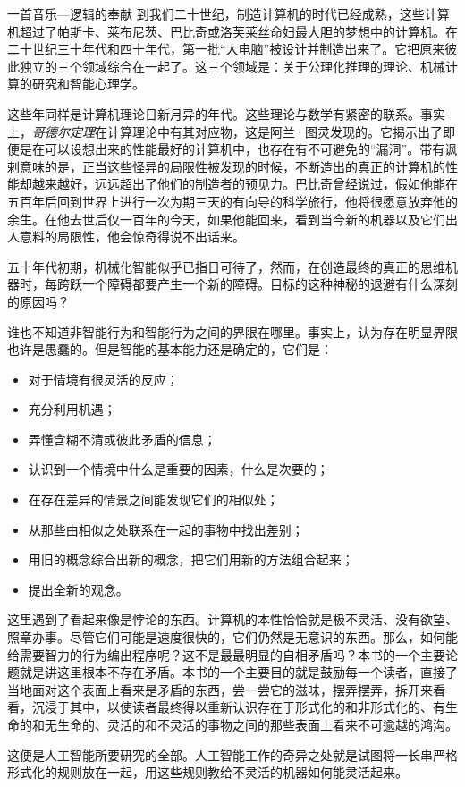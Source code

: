 \begin{intro}{一首音乐—逻辑的奉献}
到我们二十世纪，制造计算机的时代已经成熟，这些计算机超过了帕斯卡、莱布尼茨、巴比奇或洛芙莱丝命妇最大胆的梦想中的计算机。在二十世纪三十年代和四十年代，第一批“大电脑”被设计并制造出来了。它把原来彼此独立的三个领域综合在一起了。这三个领域是：关于公理化推理的理论、机械计算的研究和智能心理学。

这些年同样是计算机理论日新月异的年代。这些理论与数学有紧密的联系。事实上，\emph{哥德尔定理}在计算理论中有其对应物，这是阿兰·图灵发现的。它揭示出了即便是在可以设想出来的性能最好的计算机中，也存在有不可避免的“漏洞”。带有讽剌意味的是，正当这些怪异的局限性被发现的时候，不断造出的真正的计算机的性能却越来越好，远远超出了他们的制造者的预见力。巴比奇曾经说过，假如他能在五百年后回到世界上进行一次为期三天的有向导的科学旅行，他将很愿意放弃他的余生。在他去世后仅一百年的今天，如果他能回来，看到当今新的机器以及它们出人意料的局限性，他会惊奇得说不出话来。

五十年代初期，机械化智能似乎已指日可待了，然而，在创造最终的真正的思维机器时，每跨跃一个障碍都要产生一个新的障碍。目标的这种神秘的退避有什么深刻的原因吗？

谁也不知道非智能行为和智能行为之间的界限在哪里。事实上，认为存在明显界限也许是愚蠢的。但是智能的基本能力还是确定的，它们是：
\begin{itemize}
\item 对于情境有很灵活的反应；
\item 充分利用机遇；
\item 弄懂含糊不清或彼此矛盾的信息；
\item 认识到一个情境中什么是重要的因素，什么是次要的；
\item 在存在差异的情景之间能发现它们的相似处；
\item 从那些由相似之处联系在一起的事物中找出差别；
\item 用旧的概念综合出新的概念，把它们用新的方法组合起来；
\item 提出全新的观念。
\end{itemize}

这里遇到了看起来像是悖论的东西。计算机的本性恰恰就是极不灵活、没有欲望、照章办事。尽管它们可能是速度很快的，它们仍然是无意识的东西。那么，如何能给需要智力的行为编出程序呢？这不是最最明显的自相矛盾吗？本书的一个主要论题就是讲这里根本不存在矛盾。本书的一个主要目的就是鼓励每一个读者，直接了当地面对这个表面上看来是矛盾的东西，尝一尝它的滋味，摆弄摆弄，拆开来看看，沉浸于其中，以使读者最终得以重新认识存在于形式化的和非形式化的、有生命的和无生命的、灵活的和不灵活的事物之间的那些表面上看来不可逾越的鸿沟。

这便是人工智能所要研究的全部。人工智能工作的奇异之处就是试图将一长串严格形式化的规则放在一起，用这些规则教给不灵活的机器如何能灵活起来。


\end{intro}
